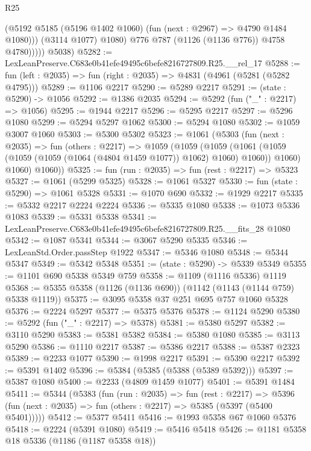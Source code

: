 \begin{lexlean}{R25}
\begin{coremodule}
                    (@5192 @5185 (@5196 @1402 @1060) (fun (next : @2967) => @4790 @1484 @1080)))
                  (@3114 @1077)
                  @1080)
                @776
                @787
                (@1126 (@1136 @776))
                @4758
                @4780)))))
      @5038)
@5282 := LexLeanPreserve.C683e0b41efe49495c6befe8216727809.R25.__rel_17
@5288 := fun (left : @2035) => fun (right : @2035) => @4831 (@4961 (@5281 (@5282 @4795)))
@5289 := @1106 @2217
@5290 := @5289 @2217
@5291 := (state : @5290) -> @1056
@5292 := @1386 @2035
@5294 := @5292 (fun ("_" : @2217) => @1056)
@5295 := @1944 @2217
@5296 := @5295 @2217
@5297 := @5296 @1080
@5299 := @5294 @5297 @1062
@5300 := @5294 @1080
@5302 := @1059 @3007 @1060
@5303 := @5300 @5302
@5323 := @1061
    (@5303
      (fun (next : @2035) =>
      fun (others : @2217) =>
      @1059
        (@1059
          (@1059
            (@1061 (@1059 (@1059 (@1059 (@1064 (@4804 @1459 @1077)) @1062) @1060) @1060))
            @1060)
          @1060)
        @1060))
@5325 := fun (run : @2035) => fun (rest : @2217) => @5323
@5327 := @1061 (@5299 @5325)
@5328 := @1061 @5327
@5330 := fun (state : @5290) => @1061 @5328
@5331 := @1070 @690
@5332 := @1929 @2217
@5335 := @5332 @2217 @2224 @2224
@5336 := @5335 @1080
@5338 := @1073 @5336 @1083
@5339 := @5331 @5338
@5341 := LexLeanPreserve.C683e0b41efe49495c6befe8216727809.R25.__fits_28 @1080
@5342 := @1087 @5341
@5344 := @3067 @5290 @5335
@5346 := LexLeanStd.Order.passStep @1922
@5347 := @5346 @1080
@5348 := @5344 @5347
@5349 := @5342 @5348
@5351 := (state : @5290) -> @5339 @5349
@5355 := @1101 @690 @5338 @5349 @759
@5358 := @1109 (@1116 @5336) @1119
@5368 := @5355 @5358 (@1126 (@1136 @690)) (@1142 (@1143 (@1144 @759) @5338 @1119))
@5375 := @3095 @5358 @37 @251 @695 @757 @1060 @5328
@5376 := @2224 @5297
@5377 := @5375 @5376
@5378 := @1124 @5290
@5380 := @5292 (fun ("_" : @2217) => @5378)
@5381 := @5380 @5297
@5382 := @3110 @5290
@5383 := @5381 @5382
@5384 := @5380 @1080
@5385 := @3113 @5290
@5386 := @1110 @2217
@5387 := @5386 @2217
@5388 := @5387 @2323
@5389 := @2233 @1077
@5390 := @1998 @2217
@5391 := @5390 @2217
@5392 := @5391 @1402
@5396 := @5384 (@5385 (@5388 (@5389 @5392)))
@5397 := @5387 @1080
@5400 := @2233 (@4809 @1459 @1077)
@5401 := @5391 @1484
@5411 := @5344
    (@5383
      (fun (run : @2035) =>
      fun (rest : @2217) =>
      @5396 (fun (next : @2035) => fun (others : @2217) => @5385 (@5397 (@5400 @5401)))))
@5412 := @5377 @5411
@5416 := @1993 @5358 @67 @1060 @5376
@5418 := @2224 (@5391 @1080)
@5419 := @5416 @5418
@5426 := @1181 @5358 @18 @5336 (@1186 (@1187 @5358 @18))

\end{coremodule}
\end{lexlean}
